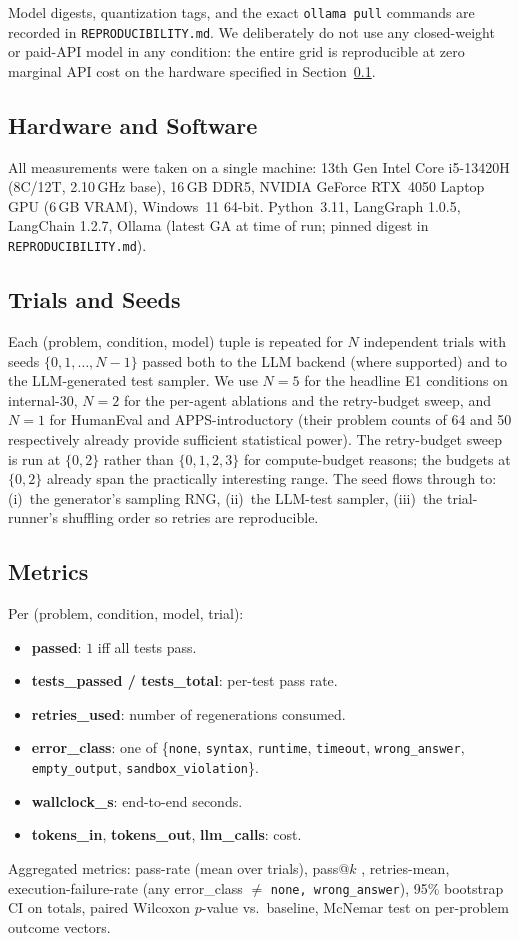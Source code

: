 \documentclass[journal]{IEEEtran}
\begin{document}
Model digests, quantization tags, and the exact \texttt{ollama pull} commands are recorded in \texttt{REPRODUCIBILITY.md}. We deliberately do not use any closed-weight or paid-API model in any condition: the entire grid is reproducible at zero marginal API cost on the hardware specified in Section~\ref{sec:hardware}.

\subsection{Hardware and Software}\label{sec:hardware}
All measurements were taken on a single machine: 13th Gen Intel Core i5-13420H (8C/12T, 2.10\,GHz base), 16\,GB DDR5, NVIDIA GeForce RTX~4050 Laptop GPU (6\,GB VRAM), Windows~11 64-bit. Python~3.11, LangGraph 1.0.5, LangChain 1.2.7, Ollama (latest GA at time of run; pinned digest in \texttt{REPRODUCIBILITY.md}).

\subsection{Trials and Seeds}\label{sec:trials}
Each (problem, condition, model) tuple is repeated for $N$ independent trials with seeds $\{0, 1, \ldots, N-1\}$ passed both to the LLM backend (where supported) and to the LLM-generated test sampler. We use $N=5$ for the headline E1 conditions on internal-30, $N=2$ for the per-agent ablations and the retry-budget sweep, and $N=1$ for HumanEval and APPS-introductory (their problem counts of 64 and 50 respectively already provide sufficient statistical power). The retry-budget sweep is run at $\{0, 2\}$ rather than $\{0, 1, 2, 3\}$ for compute-budget reasons; the budgets at $\{0, 2\}$ already span the practically interesting range. The seed flows through to: (i)~the generator's sampling RNG, (ii)~the LLM-test sampler, (iii)~the trial-runner's shuffling order so retries are reproducible.

\subsection{Metrics}\label{sec:metrics}
Per (problem, condition, model, trial):
\begin{itemize}
  \item \textbf{passed}: $1$ iff all tests pass.
  \item \textbf{tests\_passed / tests\_total}: per-test pass rate.
  \item \textbf{retries\_used}: number of regenerations consumed.
  \item \textbf{error\_class}: one of \{\texttt{none}, \texttt{syntax}, \texttt{runtime}, \texttt{timeout}, \texttt{wrong\_answer}, \texttt{empty\_output}, \texttt{sandbox\_violation}\}.
  \item \textbf{wallclock\_s}: end-to-end seconds.
  \item \textbf{tokens\_in}, \textbf{tokens\_out}, \textbf{llm\_calls}: cost.
\end{itemize}
Aggregated metrics: pass-rate (mean over trials), pass@$k$ \cite{chen2021codex}, retries-mean, execution-failure-rate (any error\_class $\neq$ \texttt{none, wrong\_answer}), 95\% bootstrap CI on totals, paired Wilcoxon $p$-value vs.\ baseline, McNemar test on per-problem outcome vectors.
\end{document}
